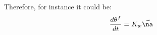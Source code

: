 Therefore, for instance it could be:
\begin{equation}
\frac{d \theta^f}{dt} = K_w \vec{\na}{}
\end{equation}